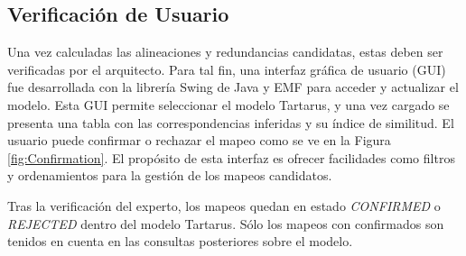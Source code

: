 \subsection{Verificaci\'on de Usuario}

Una vez calculadas las alineaciones y redundancias candidatas, estas deben ser verificadas por el arquitecto.  Para tal fin, una interfaz gr\'afica de usuario (GUI) fue desarrollada con la librer\'ia Swing de Java y EMF para acceder y actualizar el modelo. Esta GUI permite seleccionar el modelo Tartarus, y una vez cargado se presenta una tabla con las correspondencias inferidas y su \'indice de similitud. El usuario puede confirmar o rechazar el mapeo como se ve en la Figura \ref{fig:Confirmation}. El prop\'osito de esta interfaz es ofrecer facilidades como filtros y ordenamientos para la gesti\'on de los mapeos candidatos. 

Tras la verificaci\'on del experto, los mapeos quedan en estado \textit{CONFIRMED} o \textit{REJECTED} dentro del modelo Tartarus. S\'olo los mapeos con confirmados son tenidos en cuenta en las consultas posteriores sobre el modelo.

